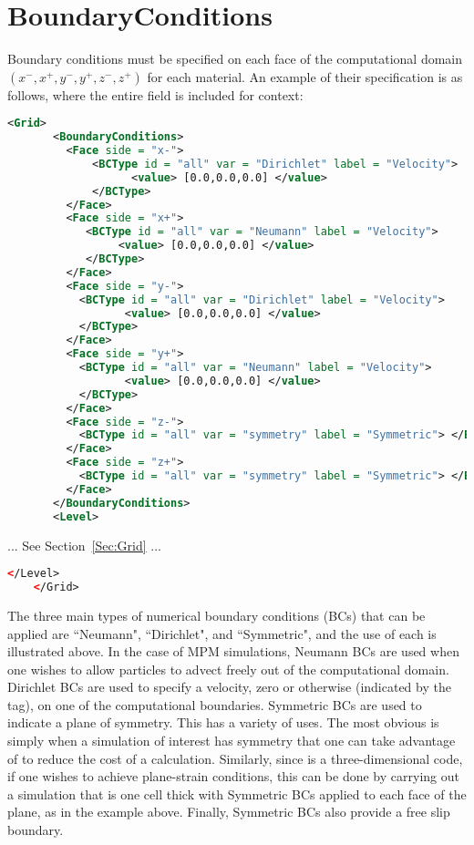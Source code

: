 \section{BoundaryConditions} \label{Sec:MPM_BCs}

Boundary conditions must be specified on each face of the computational
domain $(x^-, x^+, y^-, y^+,z^-,z^+)$ for each material.  An example of their
specification is as follows, where the entire  field
is included for context:
\begin{lstlisting}[language=XML]
    <Grid>
       <BoundaryConditions>
         <Face side = "x-">
             <BCType id = "all" var = "Dirichlet" label = "Velocity">
                   <value> [0.0,0.0,0.0] </value>
             </BCType>
         </Face>
         <Face side = "x+">
            <BCType id = "all" var = "Neumann" label = "Velocity">
                 <value> [0.0,0.0,0.0] </value>
            </BCType>
         </Face>
         <Face side = "y-">
           <BCType id = "all" var = "Dirichlet" label = "Velocity">
                  <value> [0.0,0.0,0.0] </value>
           </BCType>
         </Face>
         <Face side = "y+">
           <BCType id = "all" var = "Neumann" label = "Velocity">
                  <value> [0.0,0.0,0.0] </value>
           </BCType>
         </Face>
         <Face side = "z-">
           <BCType id = "all" var = "symmetry" label = "Symmetric"> </BCType>
         </Face>
         <Face side = "z+">
           <BCType id = "all" var = "symmetry" label = "Symmetric"> </BCType>
         </Face>
       </BoundaryConditions>
       <Level>
\end{lstlisting}

... See Section~\ref{Sec:Grid} ...

\begin{lstlisting}[language=XML]
       </Level>
    </Grid>
\end{lstlisting}

The three main types of numerical boundary conditions (BCs) that can
be applied are ``Neumann", ``Dirichlet", and ``Symmetric", and the use of
each is illustrated above.  In the case of
MPM simulations, Neumann BCs are used when one wishes to allow particles to
advect freely out of the computational domain.  Dirichlet BCs are used to
specify a velocity, zero or otherwise (indicated by the 
tag), on one of the computational boundaries.
Symmetric BCs are used to indicate a plane of symmetry.  This has a variety
of uses.  The most obvious is simply when a simulation of interest has symmetry
that one can take advantage of to reduce the cost of a calculation.  Similarly,
since \Vaango is a three-dimensional code, if one wishes to achieve plane-strain
conditions, this can be done by carrying out a simulation that is one cell thick
with Symmetric BCs applied to each face of the plane, as in the example above.
Finally, Symmetric BCs also provide a free slip boundary.

